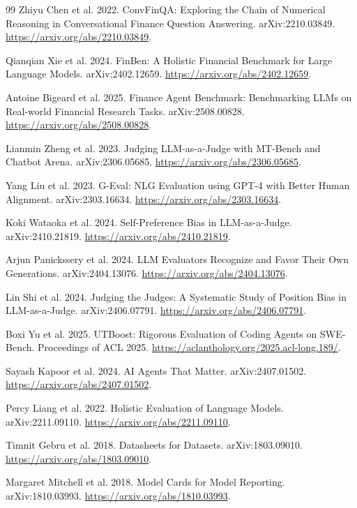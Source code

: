 \documentclass[11pt,letterpaper]{article}
\begin{document}
\begin{thebibliography}{99}
 Zhiyu Chen et al. 2022. ConvFinQA: Exploring the Chain of Numerical Reasoning in Conversational Finance Question Answering. arXiv:2210.03849. \url{https://arxiv.org/abs/2210.03849}.

 Qianqian Xie et al. 2024. FinBen: A Holistic Financial Benchmark for Large Language Models. arXiv:2402.12659. \url{https://arxiv.org/abs/2402.12659}.

 Antoine Bigeard et al. 2025. Finance Agent Benchmark: Benchmarking LLMs on Real-world Financial Research Tasks. arXiv:2508.00828. \url{https://arxiv.org/abs/2508.00828}.

 Lianmin Zheng et al. 2023. Judging LLM-as-a-Judge with MT-Bench and Chatbot Arena. arXiv:2306.05685. \url{https://arxiv.org/abs/2306.05685}.

 Yang Liu et al. 2023. G-Eval: NLG Evaluation using GPT-4 with Better Human Alignment. arXiv:2303.16634. \url{https://arxiv.org/abs/2303.16634}.

 Koki Wataoka et al. 2024. Self-Preference Bias in LLM-as-a-Judge. arXiv:2410.21819. \url{https://arxiv.org/abs/2410.21819}.

 Arjun Panickssery et al. 2024. LLM Evaluators Recognize and Favor Their Own Generations. arXiv:2404.13076. \url{https://arxiv.org/abs/2404.13076}.

 Lin Shi et al. 2024. Judging the Judges: A Systematic Study of Position Bias in LLM-as-a-Judge. arXiv:2406.07791. \url{https://arxiv.org/abs/2406.07791}.

 Boxi Yu et al. 2025. UTBoost: Rigorous Evaluation of Coding Agents on SWE-Bench. Proceedings of ACL 2025. \url{https://aclanthology.org/2025.acl-long.189/}.

 Sayash Kapoor et al. 2024. AI Agents That Matter. arXiv:2407.01502. \url{https://arxiv.org/abs/2407.01502}.

 Percy Liang et al. 2022. Holistic Evaluation of Language Models. arXiv:2211.09110. \url{https://arxiv.org/abs/2211.09110}.

 Timnit Gebru et al. 2018. Datasheets for Datasets. arXiv:1803.09010. \url{https://arxiv.org/abs/1803.09010}.

 Margaret Mitchell et al. 2018. Model Cards for Model Reporting. arXiv:1810.03993. \url{https://arxiv.org/abs/1810.03993}.


\end{thebibliography}
\end{document}
